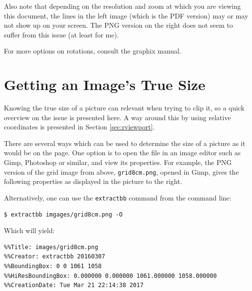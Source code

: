 \documentclass[a4paper,11pt]{article}
\newcommand\code[1]{\texttt{#1}}
\begin{document}
Also note that depending  on the resolution and zoom at  which you are viewing
this document, the lines  in the left image (which is the  PDF version) may or
may not show up on your screen. The PNG  version on the right does not seem to
suffer from this issue (at least for me).

For more options on rotations, consult the graphix manual.


\section{Getting an Image's True Size}
\label{sec:true-size}

\begin{minipage}[t][][b]{0.65\textwidth}
    Knowing the true size of a picture can relevant when trying to clip it, so
    a quick  overview on  the issue  is presented here. A  way around  this by
    using relative coordinates is presented in Section \ref{sec:rviewport}.

    There  are several  ways which  can be  used to  determine the  size of  a
    picture as  it would be  on the  page. One option is  to open the  file in
    an  image  editor  such  as  Gimp, Photoshop  or  similar,  and  view  its
    properties. For example,  the PNG  version of the  grid image  from above,
    \code{grid8cm.png},  opened in  Gimp,  gives the  following properties  as
    displayed in the picture to the right.

    Alternatively, one can  use the \code{extractbb} command  from the command
    line:
    \begin{verbatim}
$ extractbb imgages/grid8cm.png -O
    \end{verbatim}

    Which will yield:
    \begin{verbatim}
%%Title: images/grid8cm.png
%%Creator: extractbb 20160307
%%BoundingBox: 0 0 1061 1058
%%HiResBoundingBox: 0.000000 0.000000 1061.000000 1058.000000
%%CreationDate: Tue Mar 21 22:14:38 2017
    \end{verbatim}
\end{minipage}
\hfill
\end{document}
